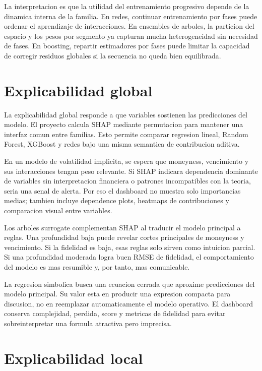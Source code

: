 La interpretacion es que la utilidad del entrenamiento progresivo depende de la dinamica interna de la familia. En redes, continuar entrenamiento por fases puede ordenar el aprendizaje de interacciones. En ensembles de arboles, la particion del espacio y los pesos por segmento ya capturan mucha heterogeneidad sin necesidad de fases. En boosting, repartir estimadores por fases puede limitar la capacidad de corregir residuos globales si la secuencia no queda bien equilibrada.

\section{Explicabilidad global}

La explicabilidad global responde a que variables sostienen las predicciones del modelo. El proyecto calcula SHAP mediante permutacion para mantener una interfaz comun entre familias. Esto permite comparar regresion lineal, Random Forest, XGBoost y redes bajo una misma semantica de contribucion aditiva.

En un modelo de volatilidad implicita, se espera que moneyness, vencimiento y sus interacciones tengan peso relevante. Si SHAP indicara dependencia dominante de variables sin interpretacion financiera o patrones incompatibles con la teoria, seria una senal de alerta. Por eso el dashboard no muestra solo importancias medias; tambien incluye dependence plots, heatmaps de contribuciones y comparacion visual entre variables.

Los arboles surrogate complementan SHAP al traducir el modelo principal a reglas. Una profundidad baja puede revelar cortes principales de moneyness y vencimiento. Si la fidelidad es baja, esas reglas solo sirven como intuicion parcial. Si una profundidad moderada logra buen RMSE de fidelidad, el comportamiento del modelo es mas resumible y, por tanto, mas comunicable.

La regresion simbolica busca una ecuacion cerrada que aproxime predicciones del modelo principal. Su valor esta en producir una expresion compacta para discusion, no en reemplazar automaticamente el modelo operativo. El dashboard conserva complejidad, perdida, score y metricas de fidelidad para evitar sobreinterpretar una formula atractiva pero imprecisa.

\section{Explicabilidad local}

